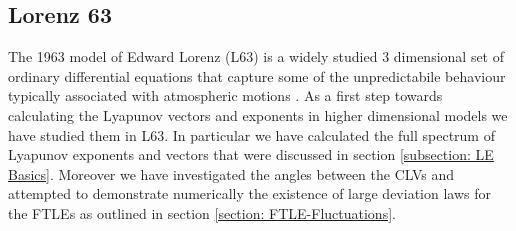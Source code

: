 \subsection{Lorenz 63} \label{subsection: L63 Results}

The 1963 model of Edward Lorenz (L63) is a widely studied $3$ dimensional set of ordinary differential equations that capture some of the unpredictabile behaviour typically associated with atmospheric motions \cite{Lorenz1963} \cite{Sparrow1982}. As a first step towards calculating the Lyapunov vectors and exponents in higher dimensional models we have studied them in L63. In particular we have calculated the full spectrum of Lyapunov exponents and vectors that were discussed in section \ref{subsection: LE Basics}. Moreover we have investigated the angles between the CLVs and attempted to demonstrate numerically the existence of large deviation laws for the FTLEs as outlined in section \ref{section: FTLE-Fluctuations}.\\ 
